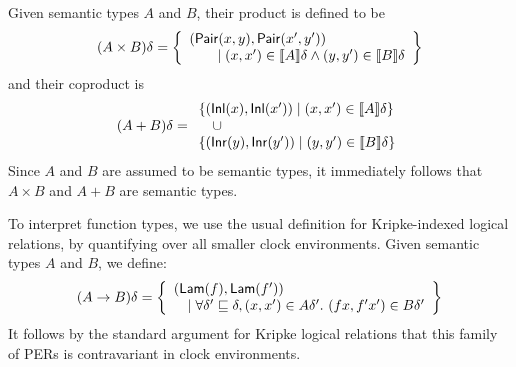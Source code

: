 Given semantic types $A$ and $B$, their product is defined to be
\begin{displaymath}
  (A \times B)\delta =
  \left\{
    \begin{array}{l}
      (\mathsf{Pair}(x,y),\mathsf{Pair}(x',y')) \\
      \quad\quad\mathrel| (x,x') \in \llbracket A \rrbracket\delta \land (y,y') \in \llbracket B \rrbracket\delta 
    \end{array}
  \right\}
\end{displaymath}
and their coproduct is
\begin{displaymath}
  (A + B)\delta =
  \begin{array}{l}
    \{ (\mathsf{Inl}(x), \mathsf{Inl}(x')) \mathrel| (x,x') \in \llbracket A \rrbracket\delta \} \\
    \quad \cup \\
    \{ (\mathsf{Inr}(y),\mathsf{Inr}(y')) \mathrel| (y,y') \in \llbracket B \rrbracket\delta \}
  \end{array}
\end{displaymath}
Since $A$ and $B$ are assumed to be semantic types, it immediately
follows that $A \times B$ and $A + B$ are semantic types.

To interpret function types, we use the usual definition for
Kripke-indexed logical relations, by quantifying over all smaller clock
environments. Given semantic types $A$ and $B$, we define:
\begin{displaymath}
  (A \to B)\delta = \left\{
    \begin{array}{l}
      (\mathsf{Lam}(f),\mathsf{Lam}(f')) \\
      \quad \mathrel| \forall \delta' \sqsubseteq \delta, (x,x') \in A\delta'.\ (fx,f'x') \in B\delta'
    \end{array}
  \right\}
\end{displaymath}
It follows by the standard argument for Kripke logical relations that
this family of PERs is contravariant in clock environments.

